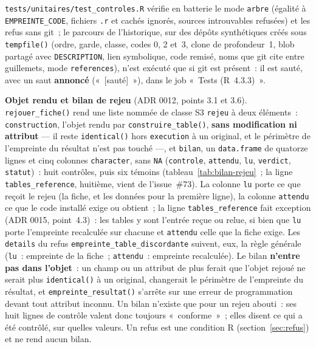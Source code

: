 \documentclass[a4paper,11pt]{article}
\newcommand{\code}[1]{\texttt{\small #1}}
\begin{document}
\code{tests/unitaires/test\_controles.R} vérifie en batterie le mode
\code{arbre} (égalité à \code{EMPREINTE\_CODE}, fichiers \code{.r} et
cachés ignorés, sources introuvables refusées) et les refus sans git~; le
parcours de l'historique, sur des dépôts synthétiques créés sous
\code{tempfile()} (ordre, garde, classe, codes 0, 2 et~3, clone de
profondeur~1, blob partagé avec \code{DESCRIPTION}, lien symbolique, code
remisé, noms que git cite entre guillemets, mode \code{references}), n'est
exécuté que si git est présent~: il est sauté, avec un saut
\textbf{annoncé} («~[sauté]~»), dans le job «~Tests (R~4.3.3)~».

\medskip
\noindent
\textbf{Objet rendu et bilan de rejeu} (ADR 0012, points 3.1 et 3.6).
\code{rejouer\_fiche()} rend une liste nommée de classe S3 \code{rejeu} à deux
éléments~: \code{construction}, l'objet rendu par \code{construire\_table()},
\textbf{sans modification ni attribut} --- il reste \code{identical()} hors
\code{execution} à un original, et le périmètre de l'empreinte du résultat
n'est pas touché ---, et \code{bilan}, un \code{data.frame} de quatorze lignes
et cinq colonnes \code{character}, sans \code{NA} (\code{controle},
\code{attendu}, \code{lu}, \code{verdict}, \code{statut})~: huit contrôles,
puis six témoins (tableau~\ref{tab:bilan-rejeu}~; la ligne
\code{tables\_reference}, huitième, vient de l'issue~\#73). La colonne \code{lu}
porte ce que reçoit le rejeu (la fiche, et les données pour la première
ligne), la colonne \code{attendu} ce que le code installé exige ou obtient~;
la ligne \code{tables\_reference} fait exception (ADR 0015, point~4.3)~: les
tables y sont l'entrée reçue ou relue, si bien que \code{lu} porte
l'empreinte recalculée sur chacune et \code{attendu} celle que la fiche
exige. Les \code{details} du refus \code{empreinte\_table\_discordante}
suivent, eux, la règle générale (\code{lu}~: empreinte de la fiche~;
\code{attendu}~: empreinte recalculée).
Le bilan \textbf{n'entre pas dans l'objet}~: un champ ou un attribut de plus
ferait que l'objet rejoué ne serait plus \code{identical()} à un original,
changerait le périmètre de l'empreinte du résultat, et
\code{empreinte\_resultat()} s'arrête sur une erreur de programmation devant
tout attribut inconnu. Un bilan n'existe
que pour un rejeu abouti~: ses huit lignes de contrôle valent donc toujours
«~conforme~»~; elles disent ce qui a été contrôlé, sur quelles valeurs. Un
refus est une condition R (section~\ref{sec:refus}) et ne rend aucun bilan.
\end{document}

